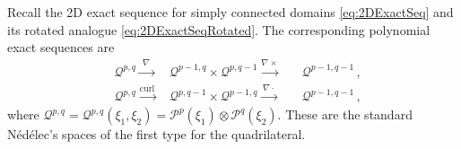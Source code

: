 
Recall the 2D exact sequence for simply connected domains \eqref{eq:2DExactSeq} and its rotated analogue \eqref{eq:2DExactSeqRotated}.
The corresponding polynomial exact sequences are
\begin{equation}
	\begin{alignedat}{4}
    &\mathcal{Q}^{p,q} \xrightarrow{\,\,\nabla\,\,} & \mathcal{Q}^{p-1,q}\times\mathcal{Q}^{p,q-1} 
    	\xrightarrow{\nabla\times} &&\mathcal{Q}^{p-1,q-1} \,,\\
    &\mathcal{Q}^{p,q} \xrightarrow{\mathrm{curl}\,} &\mathcal{Q}^{p,q-1}\times\mathcal{Q}^{p-1,q} 
    	\xrightarrow{\,\nabla\cdot\,} &&\mathcal{Q}^{p-1,q-1} \,,
	\end{alignedat}
	\label{eq:QuadES}
\end{equation}
where $\mathcal{Q}^{p,q}=\mathcal{Q}^{p,q}(\xi_1,\xi_2)=\mathcal{P}^p(\xi_1)\otimes\mathcal{P}^q(\xi_2)$. 
These are the standard N\'{e}d\'{e}lec's spaces \citeyearpar{Nedelec80} of the first type for the quadrilateral.
